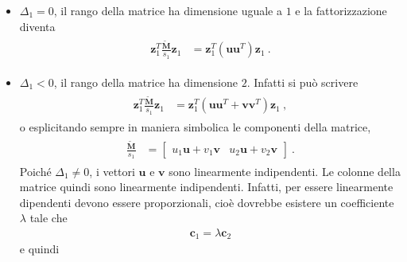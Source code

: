 \documentclass[letterpaper,10pt,italian]{jupyterBook}
\begin{document}
\begin{itemize}
\item {} 
\sphinxAtStartPar
\(\Delta_1 = 0\), il rango della matrice ha dimensione uguale a \(1\) e la fattorizzazione diventa
\begin{equation*}
\begin{split}\begin{aligned}
     \mathbf{z}_1^T \frac{\widetilde{\mathbf{M}}}{s_1} \mathbf{z}_1 
     & = \mathbf{z}_1^T \left( \mathbf{u} \mathbf{u}^T  \right) \mathbf{z}_1  \ .
   \end{aligned}\end{split}
\end{equation*}
\item {} 
\sphinxAtStartPar
\(\Delta_1 < 0\), il rango della matrice ha dimensione \(2\). Infatti si può scrivere
\begin{equation*}
\begin{split}\begin{aligned}
     \mathbf{z}_1^T \frac{\widetilde{\mathbf{M}}}{s_1} \mathbf{z}_1 
     & = \mathbf{z}_1^T \left( \mathbf{u} \mathbf{u}^T + \mathbf{v} \mathbf{v}^T \right) \mathbf{z}_1 \ ,
   \end{aligned}\end{split}
\end{equation*}
\sphinxAtStartPar
o esplicitando \sphinxhyphen{} sempre in maniera simbolica \sphinxhyphen{} le componenti della matrice,
\begin{equation*}
\begin{split}\begin{aligned}
     \frac{\widetilde{\mathbf{M}}}{s_1} 
     & = \begin{bmatrix} u_1 \mathbf{u} + v_1 \mathbf{v} & u_2 \mathbf{u} + v_2 \mathbf{v} \end{bmatrix} \ .
   \end{aligned}\end{split}
\end{equation*}
\sphinxAtStartPar
Poiché \(\Delta_1 \ne 0\), i vettori \(\mathbf{u}\) e \(\mathbf{v}\) sono linearmente indipendenti. Le colonne della matrice quindi sono linearmente indipendenti. Infatti, per essere linearmente dipendenti devono essere proporzionali, cioè dovrebbe esistere un coefficiente \(\lambda\) tale che
\begin{equation*}
\begin{split}\mathbf{c}_1 = \lambda \mathbf{c}_2\end{split}
\end{equation*}
\sphinxAtStartPar
e quindi
\begin{equation*}

\end{equation*}
\end{itemize}
\end{document}
